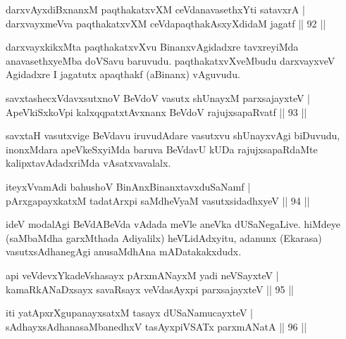 
\begin{shl}
darxvAyxdiBxnanxM paqthakatxvXM ceVdanavasethxYti satavxrA  | \\
darxvayxmeVva paqthakatxvXM ceVdapaqthakAsxyXdidaM jagatf \hfill||  92 || 
\end{shl}

\begin{artha}
darxvayxkikxMta paqthakatxvXvu BinanxvAgidadxre tavxreyiMda anavasethxyeMba doVSavu  baruvudu. paqthakatxvXveMbudu darxvayxveV Agidadxre I jagatutx apaqthakf (aBinanx) vAguvudu.
\end{artha}


\begin{shl}
savxtashecxVdavxsutxnoV BeVdoV vasutx shUnayxM parxsajayxteV  | \\
ApeVkiSxkoV\s pi kalxqqpatxtAvxnanx BeVdoV rajujxsapaRvatf \hfill||  93 ||  
\end{shl}

\begin{artha}
savxtaH vasutxvige BeVdavu iruvudAdare vasutxvu shUnayxvAgi biDuvudu,  inonxMdara apeVkeSxyiMda baruva BeVdavU kUDa rajujxsapaRdaMte kalipxtavAdadxriMda vAsatxvavalalx.
\end{artha}

\begin{shl}
iteyxVvamAdi bahushoV BinAnxBinanxtavxduSaNamf  | \\
pArxgapayxkatxM tadatArxpi saMdheVyaM vasutxsidadhxyeV \hfill||  94 ||  
\end{shl}

\begin{artha}
ideV modalAgi BeVdABeVda vAdada meVle aneVka dUSaNegaLive. hiMdeye (saMbaMdha garxMthada Adiyalilx) heVLidAdxyitu, adanunx (Ekarasa) vasutxsAdhanegAgi anusaMdhAna mADatakakxdudx.
\end{artha}

\begin{shl}
api veVdevxYkadeVshasayx pArxmANayxM yadi neVSayxteV  | \\
kamaRkANaDxsayx savaRsayx veVdasAyxpi parxsajayxteV \hfill||  95 ||  
\end{shl}

\begin{shl}
iti yatApxrXgupanayxsatxM tasayx dUSaNamucayxteV  | \\
sAdhayxsAdhanasaMbanedhxV tasAyxpiVSATx parxmANatA \hfill||  96 ||  
\end{shl}

